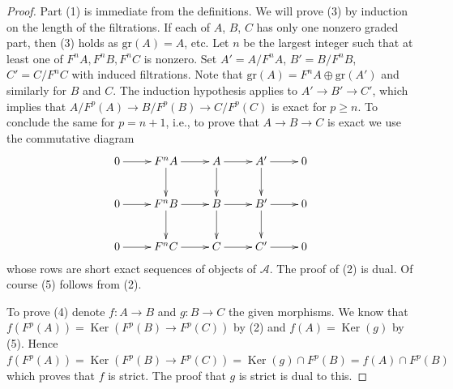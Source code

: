 \documentclass[10pt,a4paper]{amsart}
\theoremstyle{plain}
\theoremstyle{definition}
\theoremstyle{remark}
\numberwithin{equation}{subsection}
\def\Ker{\mathop{\mathrm{Ker}}}
\begin{document}
\begin{proof}
Part (1) is immediate from the definitions.
We will prove (3) by induction on the length of the filtrations.
If each of $A$, $B$, $C$ has only one
nonzero graded part, then (3) holds as $\text{gr}(A) = A$, etc.
Let $n$ be the largest integer such that at least one of
$F^nA, F^nB, F^nC$ is nonzero. Set $A' = A/F^nA$, $B' = B/F^nB$,
$C' = C/F^nC$ with induced filtrations. Note that
$\text{gr}(A) = F^nA \oplus \text{gr}(A')$
and similarly for $B$ and $C$. The induction hypothesis
applies to $A' \to B' \to C'$, which implies that
$A/F^p(A) \to B/F^p(B) \to C/F^p(C)$ is exact for $p \geq n$.
To conclude the same for $p = n + 1$, i.e., to prove that $A \to B \to C$
is exact we use the commutative diagram
$$
\xymatrix{
0 \ar[r] & F^nA \ar[r] \ar[d] & A \ar[r] \ar[d] & A' \ar[r] \ar[d] & 0 \\
0 \ar[r] & F^nB \ar[r] \ar[d] & B \ar[r] \ar[d] & B' \ar[r] \ar[d] & 0 \\
0 \ar[r] & F^nC \ar[r] & C \ar[r] & C' \ar[r] & 0
}
$$
whose rows are short exact sequences of objects of $\mathcal{A}$.
The proof of (2) is dual. Of course (5) follows from (2).

\medskip\noindent
To prove (4) denote $f : A \to B$ and $g : B \to C$ the given morphisms.
We know that $f(F^p(A)) = \Ker(F^p(B) \to F^p(C))$ by (2) and
$f(A) = \Ker(g)$ by (5). Hence
$f(F^p(A)) =  \Ker(F^p(B) \to F^p(C)) =
\Ker(g) \cap F^p(B) = f(A) \cap F^p(B)$ which proves that
$f$ is strict. The proof that $g$ is strict is dual to this.
\end{proof}
\end{document}
